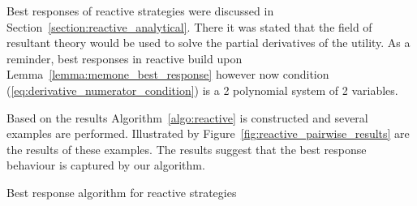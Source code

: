 \documentclass[10pt]{article}
\makeatletter
\def\BState{\State\hskip-\ALG@thistlm}
\makeatother
\begin{document}
Best responses of reactive strategies were discussed in Section~\ref{section:reactive_analytical}.
There it was stated that the field of resultant theory would be used to solve the
partial derivatives of the utility. As a reminder, best responses in reactive
build upon Lemma~\ref{lemma:memone_best_response} however now condition
(\ref{eq:derivative_numerator_condition}) is a 2 polynomial system of 2 variables.

Based on the results Algorithm~\ref{algo:reactive} is constructed and several
examples are performed. Illustrated by Figure~\ref{fig:reactive_pairwise_results}
are the results of these examples. The results suggest that the best
response behaviour is captured by our algorithm.

\begin{algorithm}
    \caption{Best response algorithm for reactive strategies}\label{algo:reactive}
\end{algorithm}
\end{document}
